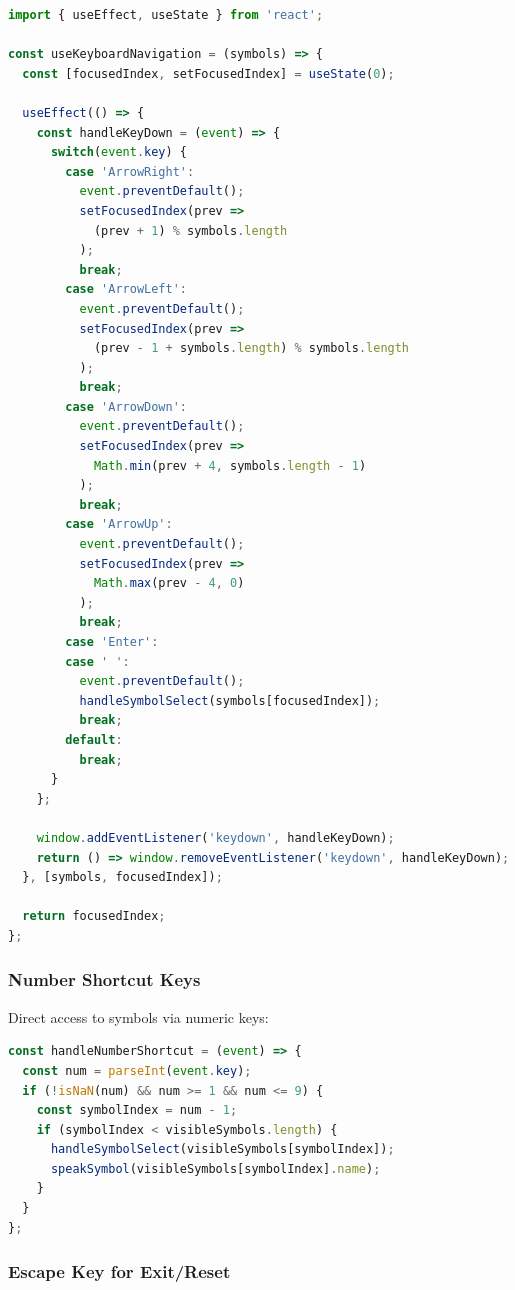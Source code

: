\documentclass[12pt, a4paper]{article}
\begin{document}
\begin{lstlisting}[language=JavaScript, caption=Keyboard Navigation Hook]
import { useEffect, useState } from 'react';

const useKeyboardNavigation = (symbols) => {
  const [focusedIndex, setFocusedIndex] = useState(0);
  
  useEffect(() => {
    const handleKeyDown = (event) => {
      switch(event.key) {
        case 'ArrowRight':
          event.preventDefault();
          setFocusedIndex(prev => 
            (prev + 1) % symbols.length
          );
          break;
        case 'ArrowLeft':
          event.preventDefault();
          setFocusedIndex(prev => 
            (prev - 1 + symbols.length) % symbols.length
          );
          break;
        case 'ArrowDown':
          event.preventDefault();
          setFocusedIndex(prev => 
            Math.min(prev + 4, symbols.length - 1)
          );
          break;
        case 'ArrowUp':
          event.preventDefault();
          setFocusedIndex(prev => 
            Math.max(prev - 4, 0)
          );
          break;
        case 'Enter':
        case ' ':
          event.preventDefault();
          handleSymbolSelect(symbols[focusedIndex]);
          break;
        default:
          break;
      }
    };
    
    window.addEventListener('keydown', handleKeyDown);
    return () => window.removeEventListener('keydown', handleKeyDown);
  }, [symbols, focusedIndex]);
  
  return focusedIndex;
};
\end{lstlisting}

\subsubsection{Number Shortcut Keys}

Direct access to symbols via numeric keys:

\begin{lstlisting}[language=JavaScript, caption=Numeric Shortcuts]
const handleNumberShortcut = (event) => {
  const num = parseInt(event.key);
  if (!isNaN(num) && num >= 1 && num <= 9) {
    const symbolIndex = num - 1;
    if (symbolIndex < visibleSymbols.length) {
      handleSymbolSelect(visibleSymbols[symbolIndex]);
      speakSymbol(visibleSymbols[symbolIndex].name);
    }
  }
};
\end{lstlisting}

\subsubsection{Escape Key for Exit/Reset}
\end{document}
